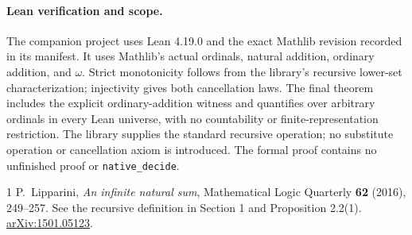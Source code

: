 \documentclass[11pt]{article}
\begin{document}
\paragraph{Lean verification and scope.}
The companion project uses Lean 4.19.0 and the exact Mathlib revision
recorded in its manifest. It uses Mathlib's actual ordinals, natural
addition, ordinary addition, and $\omega$. Strict monotonicity follows
from the library's recursive lower-set characterization; injectivity gives
both cancellation laws. The final theorem includes the explicit
ordinary-addition witness and quantifies over arbitrary ordinals in every
Lean universe, with no countability or finite-representation restriction.
The library supplies the standard recursive operation; no substitute
operation or cancellation axiom is introduced. The formal proof contains
no unfinished proof or \texttt{native\_decide}.

\begin{thebibliography}{1}\small
{} P.~Lipparini, \emph{An infinite natural sum},
Mathematical Logic Quarterly \textbf{62} (2016), 249--257.
See the recursive definition in Section 1 and Proposition 2.2(1).
\href{https://arxiv.org/abs/1501.05123}{arXiv:1501.05123}.
\end{thebibliography}
\end{document}
